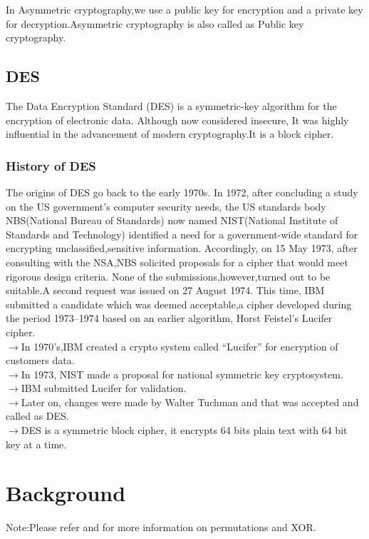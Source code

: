 \documentclass[11pt]{article}
\begin{document}
In Asymmetric cryptography,we use a public key for encryption and a private key for decryption.Asymmetric cryptography is also called as Public key cryptography.\\


\subsection{DES}

\quad\quad The Data Encryption Standard (DES) is a symmetric-key algorithm for the encryption of electronic data. Although now considered insecure, It was highly influential in the advancement of modern cryptography.It is a block cipher.

\subsubsection{History of DES}

\quad\quad The origins of DES go back to the early 1970s. In 1972, after concluding a study on the US government's computer security needs, the US standards body NBS(National Bureau of Standards) now named NIST(National Institute of Standards and Technology) identified a need for a government-wide standard for encrypting unclassified,sensitive information.
Accordingly, on 15 May 1973, after consulting with the NSA,NBS solicited proposals for a cipher that would meet rigorous design criteria. None of the submissions,however,turned out to be suitable.A second request was issued on 27 August 1974. 
This time, IBM submitted a candidate which was deemed acceptable,a cipher developed during the period 1973–1974 based on an earlier algorithm, Horst Feistel's Lucifer cipher.\\
$\rightarrow${In 1970’s,IBM created a crypto system called “Lucifer” for encryption of customers data.}\\
$\rightarrow${In 1973, NIST made a proposal for national symmetric key cryptosystem.}\\
$\rightarrow${IBM submitted Lucifer for validation.}\\
$\rightarrow${Later on, changes were made by Walter Tuchman and that was accepted and called as DES.}\\
$\rightarrow${DES is a symmetric block cipher, it encrypts 64 bits plain text with 64 bit key at a time.}\\\cite{His}



\section{Background}
Note:Please refer \cite{back} and \cite{back2} for more information on permutations and XOR.
\end{document}
